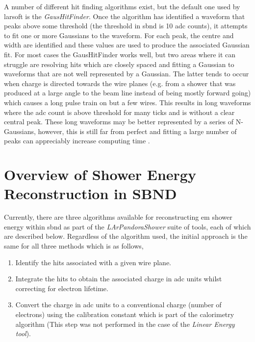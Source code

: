 A number of different hit finding algorithms exist, but the default one used by \gls{larsoft} is the \textit{GausHitFinder}. Once the algorithm has identified a waveform that peaks above some threshold (the threshold in \gls{sbnd} is 10 \gls{adc} counts), it attempts to fit one or more Gaussians to the waveform. For each peak, the centre and width are identified and these values are used to produce the associated Gaussian fit. For most cases the GausHitFinder works well, but two areas where it can struggle are resolving hits which are closely spaced and fitting a Gaussian to waveforms that are not well represented by a Gaussian. The latter tends to occur when charge is directed towards the wire planes (e.g. from a shower that was produced at a large angle to the beam line instead of being mostly forward going) which causes a long pulse train on but a few wires. This results in long waveforms where the \gls{adc} count is above threshold for many ticks and is without a clear central peak. These long waveforms may be better represented by a series of N-Gaussians, however, this is still far from perfect and fitting a large number of peaks can appreciably increase computing time \cite{gaushitfinder}. 

\section{Overview of Shower Energy Reconstruction in SBND}\label{subchap:shower reco overview}

Currently, there are three algorithms available for reconstructing \gls{em} shower energy within \gls{sbnd} as part of the \textit{LArPandoraShower} suite of tools, each of which are described below. Regardless of the algorithm used, the initial approach is the same for all three methods which is as follows,
\begin{enumerate}
    \item Identify the hits associated with a given wire plane.
    \item Integrate the hits to obtain the associated charge in \gls{adc} units whilst correcting for electron lifetime. 
    \item Convert the charge in \gls{adc} units to a conventional charge (number of electrons) using the calibration constant which is part of the calorimetry algorithm (This step was not performed in the case of the \textit{Linear Energy tool}). 
\end{enumerate}

